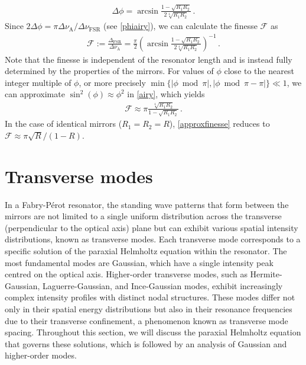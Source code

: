 \documentclass[../Thesis-IJspeert.tex]{subfiles}
\begin{document}
\begin{align}
	\Delta\phi=\arcsin{\frac{1-\sqrt{R_1R_2}}{2\sqrt[4]{R_1R_2}}}\,.
\end{align}
Since $2\Delta\phi={\pi\Delta\nu_\mathrm{A}}/{\Delta\nu_\mathrm{FSR}}$ (see \autoref{phiairy}), we can calculate the finesse $\mathcal{F}$ as
\begin{align}
	\mathcal{F}:=\frac{\Delta_\mathrm{FSR}}{\Delta\nu_\mathrm{A}}=\frac{\pi}{2}\left(\arcsin{\frac{1-\sqrt{R_1R_2}}{2\sqrt[4]{R_1R_2}}}\right)^{-1}\,.
\end{align}
Note that the finesse is independent of the resonator length and is instead fully determined by the properties of the mirrors. For values of $\phi$ close to the nearest integer multiple of $\phi$, or more precisely $\min\{\lvert \phi \bmod \pi \rvert, \lvert \phi \bmod \pi - \pi\rvert\} \ll 1$, we can approximate $\sin^2(\phi)\approx\phi^2$ in \autoref{airy}, which yields
\begin{align}
	\label{approxfinesse}
	\mathcal{F}\approx \pi \frac{\sqrt[4]{R_1R_2}}{1-\sqrt{R_1R_2}}\,.
\end{align}
In the case of identical mirrors ($R_1=R_2=R$), \autoref{approxfinesse} reduces to $\mathcal{F}\approx \pi{\sqrt{R}}/(1-R)$.

\section{Transverse modes}
In a Fabry-Pérot resonator, the standing wave patterns that form between the mirrors are not limited to a single uniform distribution across the transverse (perpendicular to the optical axis) plane but can exhibit various spatial intensity distributions, known as transverse modes. Each transverse mode corresponds to a specific solution of the paraxial Helmholtz equation within the resonator. The most fundamental modes are Gaussian, which have a single intensity peak centred on the optical axis. Higher-order transverse modes, such as Hermite-Gaussian, Laguerre-Gaussian, and Ince-Gaussian modes, exhibit increasingly complex intensity profiles with distinct nodal structures. These modes differ not only in their spatial energy distributions but also in their resonance frequencies due to their transverse confinement, a phenomenon known as transverse mode spacing. Throughout this section, we will discuss the paraxial Helmholtz equation that governs these solutions, which is followed by an analysis of Gaussian and higher-order modes.
\end{document}
